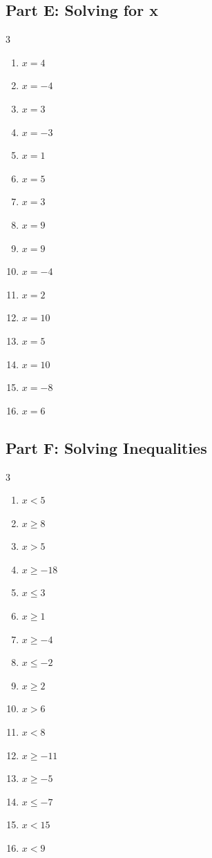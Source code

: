 \documentclass[11pt]{article}
\begin{document}
\subsection*{Part E: Solving for x}
\begin{multicols}{3}
\begin{enumerate}
  \item $x = 4$
  \item $x = -4$
  \item $x = 3$
  \item $x = -3$
  \item $x = 1$
  \item $x = 5$
  \item $x = 3$
  \item $x = 9$
  \item $x = 9$
  \item $x = -4$
  \item $x = 2$
  \item $x = 10$
  \item $x = 5$
  \item $x = 10$
  \item $x = -8$
  \item $x = 6$
\end{enumerate}
\end{multicols}
\subsection*{Part F: Solving Inequalities}
\begin{multicols}{3}
\begin{enumerate}
  \item $x < 5$
  \item $x \ge 8$
  \item $x > 5$
  \item $x \ge -18$
  \item $x \le 3$
  \item $x \ge 1$
  \item $x \ge -4$
  \item $x \le -2$
  \item $x \ge 2$
  \item $x > 6$
  \item $x < 8$
  \item $x \ge -11$
  \item $x \ge -5$
  \item $x \le -7$
  \item $x < 15$
  \item $x < 9$
\end{enumerate}
\end{multicols}
\end{document}
